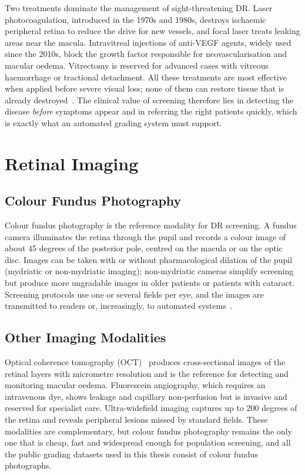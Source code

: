 Two treatments dominate the management of sight-threatening DR. Laser photocoagulation,
introduced in the 1970s and 1980s, destroys ischaemic peripheral retina to reduce the
drive for new vessels, and focal laser treats leaking areas near the macula.
Intravitreal injections of anti-VEGF agents, widely used since the 2010s, block the
growth factor responsible for neovascularisation and macular oedema. Vitrectomy is
reserved for advanced cases with vitreous haemorrhage or tractional detachment. All these
treatments are most effective when applied before severe visual loss; none of them can
restore tissue that is already destroyed~\cite{cheung2010dr,wong2016dr}. The clinical
value of screening therefore lies in detecting the disease \emph{before} symptoms appear
and in referring the right patients quickly, which is exactly what an automated grading
system must support.

\section{Retinal Imaging}
\label{sec:imaging}

\subsection{Colour Fundus Photography}

Colour fundus photography is the reference modality for DR screening. A fundus camera
illuminates the retina through the pupil and records a colour image of about 45 degrees
of the posterior pole, centred on the macula or on the optic disc. Images can be taken
with or without pharmacological dilation of the pupil (mydriatic or non-mydriatic
imaging); non-mydriatic cameras simplify screening but produce more ungradable images in
older patients or patients with cataract. Screening protocols use one or several fields
per eye, and the images are transmitted to readers or, increasingly, to automated
systems~\cite{abramoff2010retinal}.

\subsection{Other Imaging Modalities}

Optical coherence tomography (OCT)~\cite{huang1991oct} produces cross-sectional images
of the retinal layers with micrometre resolution and is the reference for detecting and
monitoring macular oedema. Fluorescein angiography, which requires an intravenous dye,
shows leakage and capillary non-perfusion but is invasive and reserved for specialist
care. Ultra-widefield imaging captures up to 200 degrees of the retina and reveals
peripheral lesions missed by standard fields. These modalities are complementary, but
colour fundus photography remains the only one that is cheap, fast and widespread enough
for population screening, and all the public grading datasets used in this thesis consist
of colour fundus photographs.

